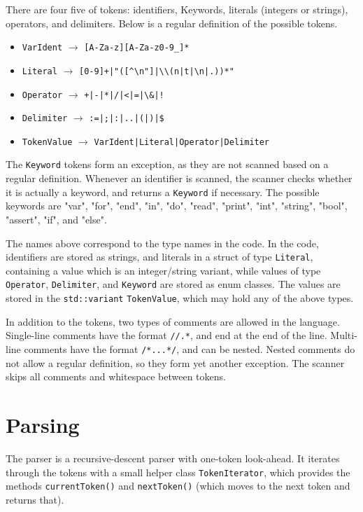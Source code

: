 \documentclass[a4paper]{article}
\newcommand*{\code}[1]{\texttt{#1}}
\begin{document}
There are four five of tokens: identifiers, Keywords, 
literals (integers or strings), operators, and delimiters.
Below is a regular definition of the possible tokens. 
\begin{itemize}
  \item[] \code{VarIdent} $\rightarrow$ \verb?[A-Za-z][A-Za-z0-9_]*?
  \item[] \code{Literal} $\rightarrow$ \verb_[0-9]+|"([^\n"]|\\(n|t|\n|.))*"_
  \item[] \code{Operator} $\rightarrow$ \verb_+|-|*|/|<|=|\&|!_
  \item[] \code{Delimiter} $\rightarrow$ \verb_:=|;|:|..|(|)|$_
  \item[] \code{TokenValue} $\rightarrow$ \verb_VarIdent|Literal|Operator|Delimiter_
\end{itemize}
The \code{Keyword} tokens form an exception, as they are not scanned 
based on a regular definition. Whenever an identifier is scanned, 
the scanner checks whether it is actually a keyword, and returns 
a \code{Keyword} if necessary.
The possible keywords are  "var", "for", "end", "in", "do", "read", "print", 
"int", "string", "bool", "assert", "if", and "else".

The names above correspond to the type names in the code.  
In the code, identifiers are stored as strings, and literals in a 
struct of type \code{Literal}, containing a value which is 
an integer/string variant, while
values of type \code{Operator}, \code{Delimiter}, and \code{Keyword} 
are stored as enum classes.
The values are stored in the \code{std::variant}
\code{TokenValue}, which may hold any of the above types. 

In addition to the tokens, two types of comments are allowed in 
the language. Single-line comments have the format \verb_//.*_, 
and end at the end of the line. Multi-line comments have the format
\verb_/*...*/_, and can be nested. Nested comments do not allow 
a regular definition, so they form yet another exception. The 
scanner skips all comments and whitespace between tokens.



\section{Parsing}

The parser is a recursive-descent parser with one-token look-ahead.
It iterates through the tokens with a small helper class 
\code{TokenIterator}, which provides the methods \code{currentToken()} 
and \code{nextToken()} (which moves to the next token and returns that).
\end{document}
